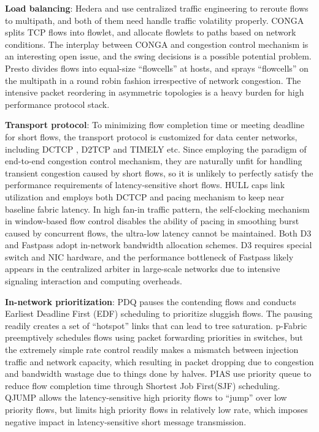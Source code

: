 \documentclass[]{sig-alternate-10pt}
\begin{document}
\textbf{Load balancing}: Hedera \cite{al2010hedera} and \cite{benson2011microte} use centralized traffic engineering to reroute flows to multipath, and both of them need handle traffic volatility properly.  CONGA \cite{alizadeh2014conga} splits TCP flows into flowlet, and allocate flowlets to paths based on network conditions. The interplay between CONGA and congestion control mechanism is an interesting open issue, and the swing decisions is a possible potential problem. Presto \cite{he2015presto} divides flows into equal-size ``flowcells'' at hosts, and sprays ``flowcells'' on the multipath in a round robin fashion irrespective of network congestion. The intensive packet reordering in asymmetric topologies is a heavy burden for high performance protocol stack.

\textbf{Transport protocol}: To minimizing flow completion time or meeting deadline for short flows, the transport protocol is customized for data center networks, including DCTCP \cite{alizadeh2011data}, D2TCP \cite{vamanan2012deadline} and TIMELY \cite{mittal2015timely} etc. Since employing the paradigm of end-to-end congestion control mechanism, they are naturally unfit for handling transient congestion caused by short flows, so it is unlikely to perfectly satisfy the performance requirements of latency-sensitive short flows. HULL \cite{perry2014fastpass} caps link utilization and employs both DCTCP and pacing mechanism to keep near baseline fabric latency. In high fan-in traffic pattern, the self-clocking mechanism in window-based flow control disables the ability of pacing in smoothing burst caused by concurrent flows, the ultra-low latency cannot be maintained. Both D3 \cite{wilson2011better} and Fastpass \cite{alizadeh2012less} adopt in-network bandwidth allocation schemes. D3 requires special switch and NIC hardware, and the performance bottleneck of Fastpass likely appears in the centralized arbiter in large-scale networks due to intensive signaling interaction and computing overheads.

\textbf{In-network prioritization}: PDQ \cite{hong2012finishing} pauses the contending flows and conducts Earliest Deadline First (EDF) scheduling to prioritize sluggish flows. The pausing readily creates a set of ``hotspot'' links that can lead to tree saturation. p-Fabric \cite{alizadeh2013pfabric} preemptively schedules flows using packet forwarding priorities in switches, but the extremely simple rate control readily makes a mismatch between injection traffic and network capacity, which resulting in packet dropping due to congestion and bandwidth wastage due to things done by halves. PIAS \cite{bai2015information} use priority queue to reduce flow completion time through Shortest Job First(SJF) scheduling. QJUMP \cite{grosvenor2015queues} allows the latency-sensitive high priority flows to ``jump'' over low priority flows, but limits high priority flows in relatively low rate, which imposes negative impact in latency-sensitive short message transmission.
\end{document}
